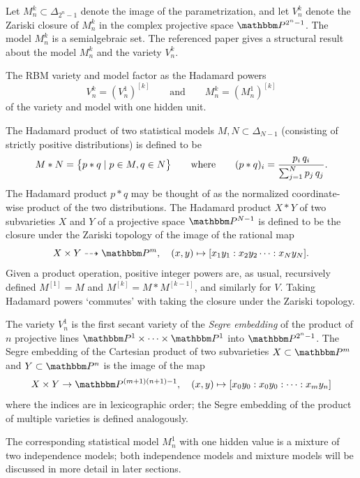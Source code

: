 \documentclass[11pt,titlepage]{article}
\numberwithin{equation}{section}
\begin{document}
    Let $M_n^k \subset \Delta_{2^n-1}$ denote the image of the parametrization,
    and let $V_n^k$ denote the Zariski closure of $M_n^k$ in the complex
    projective space $\Proj^{2^n-1}$.  The model $M_n^k$ is a semialgebraic set.
    The referenced paper gives a structural result about the model $M_n^k$ and
    the variety $V_n^k$.
    \begin{theorem} \label{thm:factor}
    The RBM variety and model factor as the Hadamard powers
    \[
        V_n^k = (V_n^1)^{[k]}
        \qquad\text{and}\qquad
        M_n^k = (M_n^1)^{[k]}
    \]
    of the variety and model with one hidden unit.
    \end{theorem}
    \noindent The Hadamard product of two statistical models $M, N \subset
    \Delta_{N-1}$ (consisting of strictly positive distributions) is defined to
    be
    \[
        M * N = \cdil[\big]{p * q \mid p \in M, q \in N}
        \qquad
        \text{where}
        \qquad
        (p * q)_i = \frac{p_i\,q_i}{\sum_{j=1}^N p_j\,q_j}.
    \]
    The Hadamard product $p*q$ may be thought of as the normalized
    coordinate-wise product of the two distributions.  The Hadamard product $X *
    Y$ of two subvarieties $X$ and $Y$ of a projective space $\Proj^{N-1}$ is
    defined to be the closure under the Zariski topology of the image of the rational map
    \[
        X \times Y \dashrightarrow \Proj^m,
        \quad
        (x, y) \mapsto [x_1y_1 : x_2y_2\cdots : x_N y_N].
    \]
    Given a product operation, positive integer powers are, as usual,
    recursively defined $M^{[1]} = M$ and $M^{[k]} = M * M^{[k-1]}$, and
    similarly for $V$.  Taking Hadamard powers `commutes' with taking the
    closure under the Zariski topology.

    The variety $V_n^1$ is the first secant variety of the \emph{Segre
    embedding} of the product of $n$ projective lines $\Proj^1 \times \cdots
    \times \Proj^1$ into $\Proj^{2^n-1}$.  The Segre embedding of the Cartesian
    product of two subvarieties $X \subset \Proj^m$ and $Y \subset \Proj^n$ is
    the image of the map
    \[
        X \times Y \to \Proj^{(m+1)(n+1) - 1},
        \quad
        (x, y) \mapsto
        [x_0y_0: x_0 y_0 : \cdots : x_my_n]
    \]
    where the indices are in lexicographic order; the Segre embedding of the
    product of multiple varieties is defined analogously.
    
    The corresponding statistical model $M_n^1$ with one hidden value is a
    mixture of two independence models; both independence models and mixture
    models will be discussed in more detail in later sections.
\end{document}
